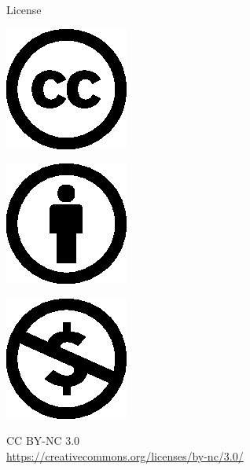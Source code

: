 \documentclass[ucs,10pt]{beamer}
\begin{document}
\begin{frame}{License}

	\begin{center}
		\begin{minipage}[b]{.32\linewidth}
			\centering
			\includegraphics[scale=.8]{cc}
		\end{minipage}
		\hspace{-.2\linewidth}
		\begin{minipage}[b]{.32\linewidth}
			\centering
			\includegraphics[scale=.8]{by}
		\end{minipage}
		\hspace{-.2\linewidth}
		\begin{minipage}[b]{.32\linewidth}
			\centering
			\includegraphics[scale=.8]{nc}
		\end{minipage}
	\end{center}

	\begin{center}
		CC BY-NC 3.0\\
		{\fontsize{7}{9} \selectfont \url{https://creativecommons.org/licenses/by-nc/3.0/}}
	\end{center}

\end{frame}
\end{document}
